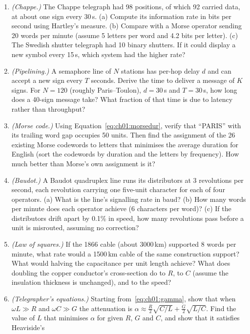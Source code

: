 \problems
{}
\begin{enumerate}[label=\thechapter.\arabic*]
\item \emph{(Chappe.)} The Chappe telegraph had 98 positions, of which 92 carried data, at about one
sign every 30\,s. (a) Compute its information rate in bits per second using Hartley's measure. (b)
Compare with a Morse operator sending 20 words per minute (assume 5 letters per word and 4.2 bits per
letter). (c) The Swedish shutter telegraph had 10 binary shutters. If it could display a new symbol
every 15\,s, which system had the higher rate?
\item \emph{(Pipelining.)} A semaphore line of $N$ stations has per-hop delay $d$ and can accept a new
sign every $T$ seconds. Derive the time to deliver a message of $K$ signs. For $N=120$ (roughly
Paris--Toulon), $d=30$\,s and $T=30$\,s, how long does a 40-sign message take? What fraction of that
time is due to latency rather than throughput?
\item \emph{(Morse code.)} Using Equation~\eqref{eq:ch01:morsedur}, verify that ``PARIS'' with its
trailing word gap occupies 50 units. Then find the assignment of the 26 existing Morse codewords to
letters that minimises the average duration for English (sort the codewords by duration and the letters
by frequency). How much better than Morse's own assignment is it?
\item \emph{(Baudot.)} A Baudot quadruplex line runs its distributors at 3 revolutions per second, each
revolution carrying one five-unit character for each of four operators. (a) What is the line's
signalling rate in baud? (b) How many words per minute does each operator achieve (6 characters per
word)? (c) If the distributors drift apart by 0.1\% in speed, how many revolutions pass before a unit is
misrouted, assuming no correction?
\item \emph{(Law of squares.)} If the 1866 cable (about 3000\,km) supported 8 words per minute, what rate
would a 1500\,km cable of the same construction support? What would halving the capacitance per unit
length achieve? What does doubling the copper conductor's cross-section do to $R$, to $C$ (assume the
insulation thickness is unchanged), and to the speed?
\item \emph{(Telegrapher's equations.)} Starting from~\eqref{eq:ch01:gamma}, show that when $\omega L\gg R$
and $\omega C\gg G$ the attenuation is $\alpha\approx\tfrac{R}{2}\sqrt{C/L}+\tfrac{G}{2}\sqrt{L/C}$. Find the
value of $L$ that minimises $\alpha$ for given $R$, $G$ and $C$, and show that it satisfies Heaviside's

\end{enumerate}
